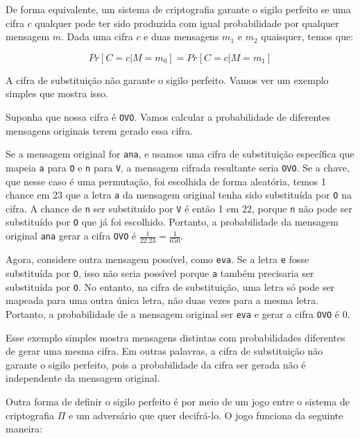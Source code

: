De forma equivalente, um sistema de criptografia garante o sigilo perfeito se uma cifra $c$ qualquer pode ter sido produzida com igual probabilidade por qualquer mensagem $m$.
Dada uma cifra $c$ e duas mensagens $m_1$ e $m_2$ quaisquer, temos que:

\begin{displaymath}
  Pr[C = c | M = m_0] = Pr[C = c | M = m_1]
\end{displaymath}


A cifra de substituição não garante o sigilo perfeito.
Vamos ver um exemplo simples que mostra isso.

\begin{example}
  Suponha que nossa cifra é {\tt OVO}.
  Vamos calcular a probabilidade de diferentes mensagens originais terem gerado essa cifra.

  Se a mensagem original for {\tt ana}, e usamos uma cifra de substituição específica que mapeia {\tt a} para {\tt O} e {\tt n} para {\tt V}, a mensagem cifrada resultante seria {\tt OVO}.
  Se a chave, que nesse caso é uma permutação, foi escolhida de forma aleatória, temos 1 chance em 23 que a letra {\tt a} da mensagem original tenha sido substituída por {\tt O} na cifra.
  A chance de {\tt n} ser substituído por {\tt V} é então 1 em 22, porque {\tt n} não pode ser substituído por {\tt O} que já foi escolhido.
  Portanto, a probabilidade da mensagem original {\tt ana} gerar a cifra {\tt OVO} é $\frac{1}{22.23} = \frac{1}{650}$.

  Agora, considere outra mensagem possível, como {\tt eva}.
  Se a letra {\tt e} fosse substituída por {\tt O}, isso não seria possível porque {\tt a} também precisaria ser substituída por {\tt O}.
  No entanto, na cifra de substituição, uma letra só pode ser mapeada para uma outra única letra, não duas vezes para a mesma letra.
  Portanto, a probabilidade de a mensagem original ser {\tt eva} e gerar a cifra {\tt OVO} é 0.

\end{example}
  
Esse exemplo simples mostra mensagens distintas com probabilidades diferentes de gerar uma mesma cifra.
Em outras palavras, a cifra de substituição não garante o sigilo perfeito, pois a probabilidade da cifra ser gerada não é independente da mensagem original.

Outra forma de definir o sigilo perfeito é por meio de um jogo entre o sistema de criptografia $\Pi$ e um adversário que quer decifrá-lo.
O jogo funciona da seguinte maneira:

